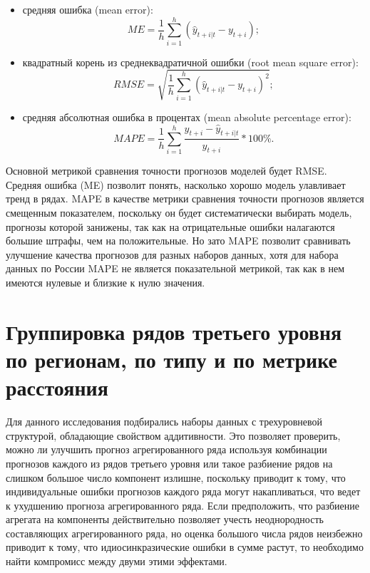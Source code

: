 \documentclass[12pt,a4paper, oneside]{extreport}
\begin{document}
\begin{itemize}
	\item  средняя ошибка (mean error):
\begin{equation}\label{key}
ME = \frac{1}{h} \sum_{i=1}^h(\hat{y}_{t+i|t}-y_{t+i}) ;
\end{equation}
\item  квадратный корень из среднеквадратичной ошибки (root mean square error):
\begin{equation}\label{key}
RMSE = \sqrt{  \frac{1}{h} \sum_{i=1}^h(\hat{y}_{t+i|t}-y_{t+i})^2} ;
\end{equation}
\item  средняя абсолютная ошибка в процентах  (mean absolute percentage error):
\begin{equation}\label{key}
MAPE = \frac{1}{h} \sum_{i=1}^h \frac{y_{t+i} - \hat{y}_{t+i|t} }{y_{t+i}} * 100\%.
\end{equation}

\end{itemize}

Основной метрикой сравнения точности прогнозов моделей будет  RMSE. Средняя ошибка (ME) позволит понять, насколько хорошо модель улавливает тренд в рядах.  MAPE в качестве метрики сравнения точности прогнозов является смещенным показателем, поскольку он будет систематически выбирать модель, прогнозы которой занижены, так как на отрицательные ошибки налагаются большие штрафы, чем на положительные. 
Но зато MAPE позволит сравнивать улучшение качества прогнозов для разных наборов данных, хотя  для набора данных по России MAPE не является показательной метрикой, так как в нем имеются нулевые и близкие к нулю значения.


\section{Группировка рядов третьего уровня по регионам, по типу и по метрике расстояния}

Для данного исследования подбирались наборы данных с трехуровневой структурой, обладающие свойством аддитивности. Это позволяет проверить,  можно ли улучшить прогноз агрегированного ряда используя  комбинации прогнозов каждого из рядов третьего уровня или такое  разбиение рядов на слишком большое число компонент излишне, поскольку приводит к тому, что индивидуальные ошибки прогнозов каждого ряда могут накапливаться, что ведет  к ухудшению прогноза агрегированного ряда. Если предположить, что разбиение агрегата на компоненты действительно позволяет учесть неоднородность составляющих агрегированного ряда, но оценка большого числа рядов неизбежно приводит к тому, что идиосинкразические    ошибки в сумме растут,     то необходимо найти компромисс между двуми этими эффектами. 
\end{document}
